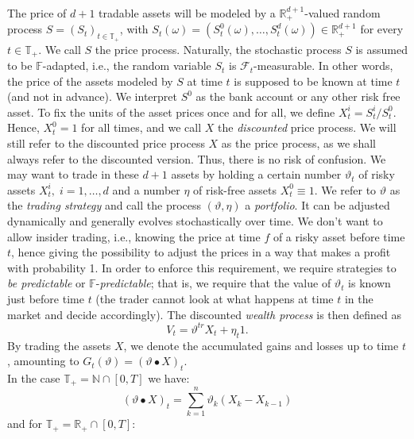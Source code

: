 \documentclass[11pt,a4paper,twoside,openany]{report}
\theoremstyle{plain} %
\theoremstyle{definition} %
\theoremstyle{remark} %
\begin{document}
The price of \(d+1\) tradable assets will be modeled by a \(\mathbb{R}_+^{d+1}\)-valued random process \(S = (S_t)_{t\in\mathbb{T}_+}\), with \(S_t(\omega) = (S_t^0(\omega),\dots,S_t^d(\omega))\in \mathbb{R}_+^{d+1}\) for every \(t\in \mathbb{T}_+\). We call \(S\) the price process. Naturally, the stochastic process \(S\) is assumed to be \(\mathbb{F}\)-adapted, i.e., the random variable \(S_t\) is \(\mathcal{F}_t\)-measurable. In other words, the price of the assets modeled by \(S\) at time \(t\) is supposed to be known at time \(t\) (and not in advance). We interpret \(S^0\) as the bank account or any other risk free asset. To fix the units of the asset prices once and for all, we define \(X_t^{i}=S_t^{i}/S_t^0\). Hence, \(X_t^0 = 1\) for all times, and we call \(X\) the \textit{discounted} price process. We will still refer to the discounted price process \(X\) as the price process, as we shall always refer to the discounted version. Thus, there is no risk of confusion.
\bigbreak
We may want to trade in these \(d+1\) assets by holding a certain number \(\vartheta_t\) of risky assets \(X_t^i,\;i=1,\dots,d\) and a number \(\eta\) of risk-free assets \(X_t^0\equiv 1\). We refer to \(\vartheta\) as the \textit{trading strategy} and call the process \((\vartheta,\eta)\) a \textit{portfolio}. It can be adjusted dynamically and generally evolves stochastically over time. We don't want to allow insider trading, i.e., knowing the price at time \(f\) of a risky asset before time \(t\), hence giving the possibility to adjust the prices in a way that makes a profit with probability 1. In order to enforce this requirement, we require strategies to \textit{be predictable} or \(\mathbb{F}\)-\textit{predictable}; that is, we require that the value of \(\vartheta_t\) is known just before time \(t\) (the trader cannot look at what happens at time \(t\) in the market and decide accordingly). 
The discounted \textit{wealth process} is then defined as 
\begin{equation}
    V_t = \vartheta^{tr}X_t+\eta_t1.
\end{equation}
By trading the assets \(X\), we denote the accumulated gains and losses up to time \(t\), amounting to \(G_t(\vartheta) = (\vartheta \bullet X)_t\). 
\\ In the case \(\mathbb{T}_+=\mathbb{N}\cap [0,T]\) we have: 
\begin{equation}\label{eq:discrete accumulated gains}
    (\vartheta \bullet X)_t=\sum_{k=1}^{n}\vartheta_k(X_{k}-X_{k-1})
\end{equation}
and for \(\mathbb{T}_+=\mathbb{R}_+\cap [0,T]\):
\end{document}
